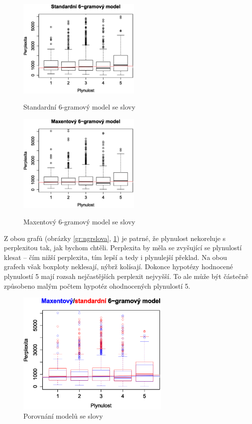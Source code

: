 \documentclass[12pt,a4paper]{report}
\begin{document}
\begin{figure}[!htb]
\begin{center}
  \centering\includegraphics[width=60mm]{./grafy/morf/ngram/text.svg.eps}
  \caption{Standardní 6-gramový model se slovy}\label{gr:ngrslova}
\endminipage\quad
{}
  \centering\includegraphics[width=60mm]{./grafy/morf/maxent/text.svg.eps}
  \caption{Maxentový 6-gramový model se slovy}\label{gr:maxslova}
\endminipage
\end{center}
\end{figure}




Z obou grafů (obrázky \ref{gr:ngrslova}, \ref{gr:maxslova}) je patrné, že plynulost nekoreluje s perplexitou tak, jak bychom chtěli. Perplexita by měla se zvyšující se plynulostí klesat -- čím nižší perplexita, tím lepší a tedy i plynulejší překlad. Na obou grafech však boxploty neklesají, nýbrž kolísají. Dokonce hypotézy hodnocené plynulostí 5 mají rozsah nejčastějších perplexit nejvyšší. To ale může být částečně způsobeno malým počtem hypotéz ohodnocených plynulostí 5.


\begin{figure}[!htbp]
\begin{center}
	\centering
	\includegraphics[width=75mm]{./grafy/morf/porovnani/text.svg.eps}
	\caption{Porovnání modelů se slovy}\label{gr:porslova}
\endminipage
\end{center}
\end{figure}
\end{document}
